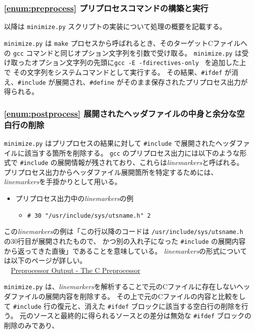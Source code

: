 \subsubsection{\ref{enum:preprocess} プリプロセスコマンドの構築と実行}
以降は \verb|minimize.py| スクリプトの実装について処理の概要を記載する。
\par
\verb|minimize.py| は \verb|make| プロセスから呼ばれるとき、そのターゲットCファイルへの \verb|gcc| コマンドと同じオプション文字列を引数で受け取る。
\verb|minimize.py| は受け取ったオプション文字列の先頭に\verb|gcc -E -fdirectives-only | を追加した上で
その文字列をシステムコマンドとして実行する。
その結果、\verb|#ifdef| が消え、\verb|#include| が展開され、\verb|#define| がそのまま保存されたプリプロセス出力が得られる。
\subsubsection{\ref{enum:postprocess} 展開されたヘッダファイルの中身と余分な空白行の削除}
\verb|minimize.py| はプリプロセスの結果に対して \verb|#include| で展開されたヘッダファイルに該当する箇所を削除する。
\verb|gcc| のプリプロセス出力には以下のような形式で \verb|#include| の展開情報が残されており、これらは\textit{linemarkers}と呼ばれる。
プリプロセス出力からヘッダファイル展開箇所を特定するためには、\textit{linemarkers}を手掛かりとして用いる。
\begin{itemize}
  \item プリプロセス出力中の\textit{linemarkers}の例
  \begin{itemize}
    \item[] \verb|# 30 "/usr/include/sys/utsname.h" 2|
  \end{itemize}
\end{itemize}
\par
この\textit{linemarkers}の例は「この行以降のコードは \verb|/usr/include/sys/utsname.h| の30行目が展開されたもので、
かつ別の入れ子になった \verb|#include| の展開内容から返ってきた直後」であることを意味している。
\textit{linemarkers}の形式については以下のページが詳しい。 \\
　\href{https://gcc.gnu.org/onlinedocs/cpp/Preprocessor-Output.html}{Preprocessor Output - The C Preprocessor} \cite{linemarkers}
\par
\verb|minimize.py| は、\textit{linemarkers}を解析することで元のCファイルに存在しないヘッダファイルの展開内容を削除する。
その上で元のCファイルの内容と比較をして \verb|#include| 行の復元と、消えた \verb|#ifdef| ブロックに該当する空白行の削除を行う。
元のソースと最終的に得られるソースとの差分は無効な \verb|#ifdef| ブロックの削除のみであり、
